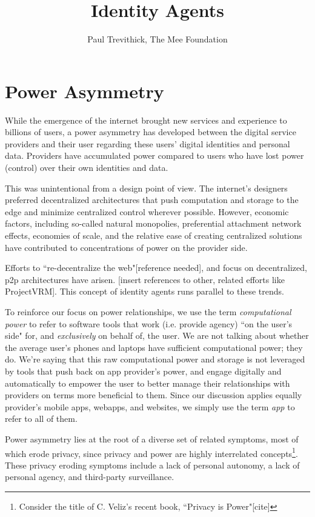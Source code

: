 \documentclass[11pt, oneside]{article}   	%
\title{Identity Agents}
\author{Paul Trevithick, The Mee Foundation}
\begin{document}
\maketitle

\section{Power Asymmetry}
While the emergence of the internet brought new services and experience to billions of users, a power asymmetry has developed between the digital service providers and their user regarding these users' digital identities and personal data. Providers have accumulated power compared to users who have lost power (control) over their own identities and data. 

This was unintentional from a design point of view. The internet's designers preferred decentralized architectures that push computation and storage to the edge and minimize centralized control wherever possible. However, economic factors, including so-called natural monopolies, preferential attachment network effects, economies of scale, and the relative ease of creating centralized solutions have contributed to  concentrations of power on the provider side. 

Efforts to ``re-decentralize the web"[reference needed], and focus on decentralized, p2p architectures have arisen. [insert references to other, related efforts like ProjectVRM]. This concept of identity agents runs parallel to these trends.

To reinforce our focus on power relationships, we use the term \emph{computational power} to refer to software tools that work (i.e. provide agency) ``on the user's side" for, and \emph{exclusively} on behalf of, the user. We are not talking about whether the average user's phones and laptops have sufficient computational power; they do. We're saying that this raw computational power and storage is not leveraged by tools that push back on app provider's power, and engage digitally and automatically to empower the user to better manage their relationships with providers on terms more beneficial to them. Since our discussion applies equally provider's mobile apps, webapps, and websites, we simply use the term \emph{app} to refer to all of them.

Power asymmetry lies at the root of a diverse set of related symptoms, most of which erode privacy, since privacy and power are highly interrelated concepts\footnote{Consider the title of C. Veliz's recent book, ``Privacy is Power"[cite]}. 
These privacy eroding symptoms include a lack of personal autonomy, a lack of personal agency, and third-party surveillance.
\end{document}
